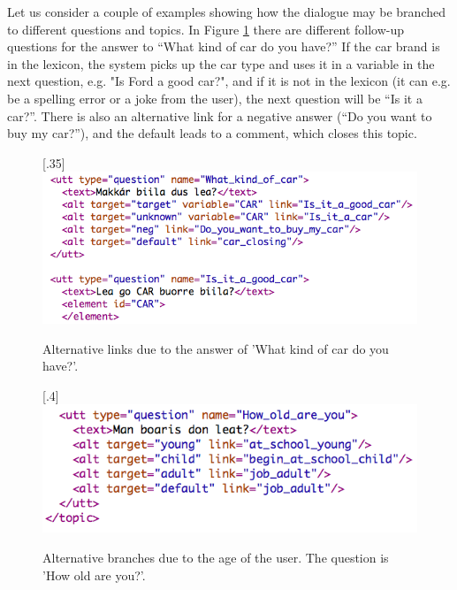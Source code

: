 \documentclass[11pt]{article}
\begin{document}

Let us consider a couple of examples showing how the dialogue may be branched to different questions and topics. In Figure \ref{car} there are different follow-up questions for the answer to “What kind of car do you have?” If the car brand is in the lexicon, the system picks up the car type and uses it in a variable in the next question, e.g. "Is Ford a good car?", and if it is not in the lexicon (it can e.g. be a spelling error or a joke from the user), the next question will be “Is it a car?”. There is also an alternative link for a negative answer (“Do you want to buy my car?”), and the default leads to a comment, which closes this topic. \\

\begin{figure}[htbp]
\begin{center}
\scalebox{.35}[.35]{\includegraphics{presentation/img/what_car.png}}\\
\caption{Alternative links due to the answer of 'What kind of car do you have?'.}
\label{car}
\end{center}
\end{figure}

\begin{figure}[htbp]
\begin{center}
\scalebox{.4}[.4]{\includegraphics{presentation/img/age_branching.png}}\\
\caption{Alternative branches due to the age of the user. The question is 'How old are you?'.}
\label{agebranches}
\end{center}
\end{figure}
\end{document}
